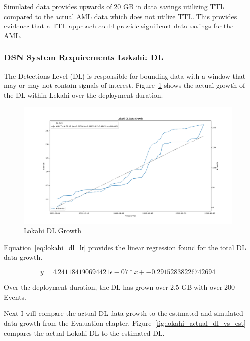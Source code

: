 Simulated data provides upwards of 20 GB in data savings utilizing TTL compared to the actual AML data which does not utilize TTL. This provides evidence that a TTL approach could provide significant data savings for the AML.

\subsubsection{DSN System Requirements Lokahi: DL}

The Detections Level (DL) is responsible for bounding data with a window that may or may not contain signals of interest. Figure~\ref{fig:lokahi_actual_dl} shows the actual growth of the DL within Lokahi over the deployment duration.

\begin{figure}[H]
    \centering
    \includegraphics[width=\linewidth]{figures/lokahi_actual_dl.png}
    \caption{Lokahi DL Growth}
    \label{fig:lokahi_actual_dl}
\end{figure}

Equation~\ref{eq:lokahi_dl_lr} provides the linear regression found for the total DL data growth.

\begin{equation}
    y = 4.241184190694421e-07 * x + -0.29152838226742694
    \label{eq:lokahi_dl_lr}
\end{equation}

Over the deployment duration, the DL has grown over 2.5 GB with over 200 Events.

Next I will compare the actual DL data growth to the estimated and simulated data growth from the Evaluation chapter. Figure~\ref{fig:lokahi_actual_dl_vs_est} compares the actual Lokahi DL to the estimated DL.

